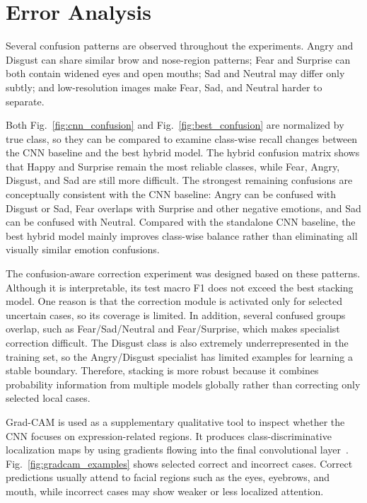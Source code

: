 \documentclass[conference]{IEEEtran}
\begin{document}
\section{Error Analysis}

Several confusion patterns are observed throughout the experiments. Angry and
Disgust can share similar brow and nose-region patterns; Fear and Surprise can
both contain widened eyes and open mouths; Sad and Neutral may differ only
subtly; and low-resolution images make Fear, Sad, and Neutral harder to
separate.

Both Fig.~\ref{fig:cnn_confusion} and Fig.~\ref{fig:best_confusion} are
normalized by true class, so they can be compared to examine class-wise recall
changes between the CNN baseline and the best hybrid model. The hybrid
confusion matrix shows that Happy and Surprise remain the most reliable
classes, while Fear, Angry, Disgust, and Sad are still more difficult. The
strongest remaining confusions are conceptually consistent with the CNN
baseline: Angry can be confused with Disgust or Sad, Fear overlaps with
Surprise and other negative emotions, and Sad can be confused with Neutral.
Compared with the standalone CNN baseline, the best hybrid model mainly
improves class-wise balance rather than eliminating all visually similar
emotion confusions.

The confusion-aware correction experiment was designed based on these patterns.
Although it is interpretable, its test macro F1 does not exceed the best
stacking model. One reason is that the correction module is activated only for
selected uncertain cases, so its coverage is limited. In addition, several
confused groups overlap, such as Fear/Sad/Neutral and Fear/Surprise, which
makes specialist correction difficult. The Disgust class is also extremely
underrepresented in the training set, so the Angry/Disgust specialist has
limited examples for learning a stable boundary. Therefore, stacking is more
robust because it combines probability information from multiple models
globally rather than correcting only selected local cases.

Grad-CAM is used as a supplementary qualitative tool to inspect whether the CNN
focuses on expression-related regions. It produces class-discriminative
localization maps by using gradients flowing into the final convolutional
layer~\cite{selvaraju2017gradcam}. Fig.~\ref{fig:gradcam_examples} shows
selected correct and incorrect cases. Correct predictions usually attend to
facial regions such as the eyes, eyebrows, and mouth, while incorrect cases may
show weaker or less localized attention.
\end{document}
